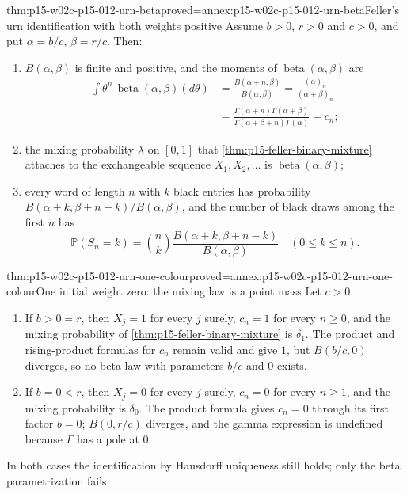 \begin{hbtheorem}{thm:p15-w02c-p15-012-urn-beta}{proved=annex:p15-w02c-p15-012-urn-beta}{Feller's urn identification with both weights positive}
Assume \(b>0\), \(r>0\) and \(c>0\), and put \(\alpha=b/c\), \(\beta=r/c\).
Then:
\begin{enumerate}
\item \(B(\alpha,\beta)\) is finite and positive, and the moments of
      \(\operatorname{beta}(\alpha,\beta)\) are
      \begin{align*}
       \int\theta^n\,\operatorname{beta}(\alpha,\beta)(d\theta)
         &=\frac{B(\alpha+n,\beta)}{B(\alpha,\beta)}
          =\frac{(\alpha)_n}{(\alpha+\beta)_n}\\
         &=\frac{\Gamma(\alpha+n)\Gamma(\alpha+\beta)}
               {\Gamma(\alpha+\beta+n)\Gamma(\alpha)}
          =c_n ;
      \end{align*}
\item the mixing probability \(\lambda\) on \([0,1]\) that
      \cref{thm:p15-feller-binary-mixture} attaches to the exchangeable
      sequence \(X_1,X_2,\ldots\) is \(\operatorname{beta}(\alpha,\beta)\);
\item every word of length \(n\) with \(k\) black entries has probability
      \(B(\alpha+k,\beta+n-k)/B(\alpha,\beta)\), and the number of black
      draws among the first \(n\) has
      \[
       \mathbb P(S_n=k)=\binom nk\frac{B(\alpha+k,\beta+n-k)}{B(\alpha,\beta)}
                     \quad(0\leq k\leq n).
      \]
\end{enumerate}
\end{hbtheorem}

\begin{hbtheorem}{thm:p15-w02c-p15-012-urn-one-colour}{proved=annex:p15-w02c-p15-012-urn-one-colour}{One initial weight zero: the mixing law is a point mass}
Let \(c>0\).
\begin{enumerate}
\item If \(b>0=r\), then \(X_j=1\) for every \(j\) surely, \(c_n=1\) for
      every \(n\geq0\), and the mixing probability of
      \cref{thm:p15-feller-binary-mixture} is \(\delta_1\). The product and
      rising-product formulas for \(c_n\) remain valid and give \(1\), but
      \(B(b/c,0)\) diverges, so no beta law with parameters \(b/c\) and
      \(0\) exists.
\item If \(b=0<r\), then \(X_j=0\) for every \(j\) surely, \(c_n=0\) for
      every \(n\geq1\), and the mixing probability is \(\delta_0\). The
      product formula gives \(c_n=0\) through its first factor \(b=0\);
      \(B(0,r/c)\) diverges, and the gamma expression is undefined because
      \(\Gamma\) has a pole at \(0\).
\end{enumerate}
In both cases the identification by Hausdorff uniqueness still holds; only
the beta parametrization fails.
\end{hbtheorem}

